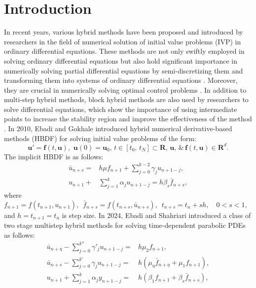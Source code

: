 \documentclass[11pt,twoside, final]{amsart}
\begin{document}
\section{\textbf{Introduction}}
In recent years, various hybrid methods have been proposed and introduced by researchers in the field of numerical solution of initial value problems (IVP) in ordinary differential equations. These methods are not only swiftly employed in solving ordinary differential equations but also hold significant importance in numerically solving partial differential equations by semi-discretizing them and transforming them into systems of ordinary differential equations \cite{ALI6,ALI3,ALI5,ALI4,ALI2,ALI1}. Moreover, they are crucial in numerically solving optimal control problems \cite{OCP1,OCP2,OCP3}. In addition to multi-step hybrid methods, block hybrid methods are also used by researchers to solve differential equations, which show the importance of using intermediate points to increase the stability region and improve the effectiveness of the method  \cite{Q24, R23}. In 2010, Ebadi and Gokhale \cite{ALI1} introduced hybrid numerical derivative-based methods (HBDF) for solving initial value problems of the  form:
\begin{equation}\label{1.2}
\boldsymbol{u'}=\boldsymbol{f}(t,\boldsymbol{u}),\,\, \boldsymbol{u}(0)=\boldsymbol{u}_{0},\, t\in [t_{0},\,t_{N}]\subset \mathbf{R},\,\boldsymbol{u},\,\&\, \boldsymbol{f}(t, \boldsymbol{u}) \in\mathbf{R} ^{d}.
\end{equation}
The implicit HBDF is as follows:
\begin{align*}
 \bar{u}_{n+s}=& h\mu f_{n+1}+\sum_{j=0}^{k-2}\gamma_{j}u_{n+1-j},\\
 u_{n+1}+&\sum_{j=1}^{k}\alpha_{j}u_{n+1-j}=   h\beta_{s}\bar{f}_{n+s},
\end{align*}
where
$f_{n+1}=f(t_{n+1},u_{n+1}),\,\,\,\bar{f}_{n+s}=f(t_{n+s}, \bar{u}_{n+s}),\,\,\, t_{n+s}=t_{n}+sh,\quad 0< s <1,$ and $h=t_{n+1}=t_{n}$ is step size.
In 2024, Ebadi and Shahriari \cite{ALI6} introduced  a  class of two stage multistep hybrid methods for solving time-dependent parabolic PDEs as follows:
\begin{align}
 \bar{u}_{n+\eta}-\sum_{j=0}^{k''}\gamma'_{j} u_{n+1-j}=& h \mu_{2} f_{n+1},\label{2.1}\\
 \bar{u}_{n+s}-\sum_{j=0}^{k'}\gamma_{j}u_{n+1-j}=& h(\mu_{\eta} \bar{ f}_{n+\eta}+ \mu_{1} f_{n+1}),\label{2.2}\\
u_{n+1}+\sum_{j=1}^{k}\alpha_{j}y_{n+1-j}= &  h(\beta_{1}f_{n+1}+\beta_{s}\bar{f}_{n+s}), \label{2.3}
\end{align}
\end{document}

